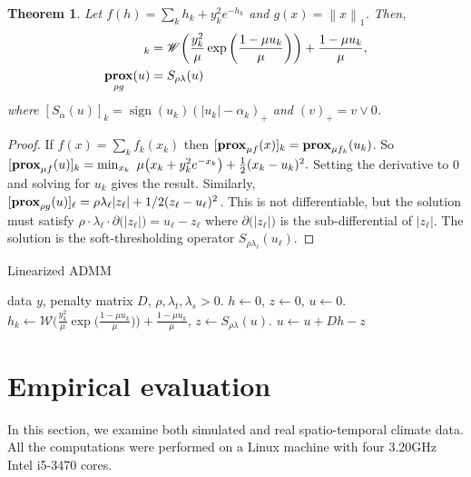 \documentclass{article}
\newtheorem{theorem}{Theorem}%
\newcommand{\norm}[1]{\left\lVert #1 \right\rVert}
\DeclareMathOperator*{\prox}{\bf prox}
\DeclareMathOperator*{\sign}{sign}
\begin{document}
\begin{theorem}
  Let $f(h) = \sum_{k} h_{k} + y_{k}^2e^{-h_{k}}$ and $g(x) =
  \norm{x}_1$. Then, 
  \begin{align}
    [\prox_{\mu f}(u)]_k &= \mathscr{W}\bigg(\frac{y_k^2}{\mu}
    \exp\bigg(\frac{1-\mu u_k}{\mu}\bigg) \bigg) + \frac{1-\mu u_k}{\mu},\\
    \prox_{\rho g}(u) &= S_{\rho\lambda}(u)
  \end{align}
where $[S_{\alpha}(u)]_k = \sign(u_k)(|u_k| -\alpha_k)_+$ and
$(v)_+=v\vee 0$.
\end{theorem}
\begin{proof}
  If $f(x)=\sum_k f_k(x_k)$ then $[\prox_{\mu f}(x)]_k =
  \prox_{\mu f_k}(u_k)$. So 
  $[\prox_{\mu f}(u)]_k=\min_{x_k} \,\,
  \mu\big(x_k+y_{k}^2e^{-x_{k}}\big)+\frac{1}{2}  (x_k-u_k)^2.$
  Setting the derivative to 0 and solving for $u_k$ gives the
  result. Similarly, $[\prox_{\rho g}(u)]_\ell=\rho
  \lambda_\ell |z_\ell|+1/2(z_\ell-u_\ell)^2$. This is not differentiable,
  but the solution must satisfy $\rho \cdot \lambda_\ell \cdot \partial
  \big(|z_\ell| \big)=u_\ell-z_\ell$ where $\partial \big(|z_\ell| \big)$ is the
  sub-differential of $|z_\ell|$. The solution is the soft-thresholding
  operator $S_{\rho\lambda_\ell}(u_\ell)$.
\end{proof}

\begin{algorithm}[tb]
  \caption{Linearized ADMM }
  \label{alg:linADMM}
  \begin{algorithmic}
     data $y$, penalty matrix $D$,
    $\rho,\lambda_t,\lambda_s >0$.
     $h\leftarrow 0$, $z\leftarrow 0$, $u\leftarrow 0$. 
    \STATE $h_k\leftarrow \mathscr{W}\bigg(\frac{y_k^2}{\mu}
    \exp\bigg(\frac{1-\mu u_k}{\mu}\bigg) \bigg) + \frac{1-\mu u_k}{\mu}$,
    \STATE $z\leftarrow S_{\rho\lambda}(u)$.
    \STATE $u\leftarrow u + Dh-z$
    \ENDFOR
  \end{algorithmic}
\end{algorithm}





\section{Empirical evaluation}
\label{sec:empirical-evaluation}

In this section, we examine both simulated and real spatio-temporal
climate data. All the computations were performed on a Linux machine
with four 3.20GHz Intel i5-3470 cores. 
\end{document}
